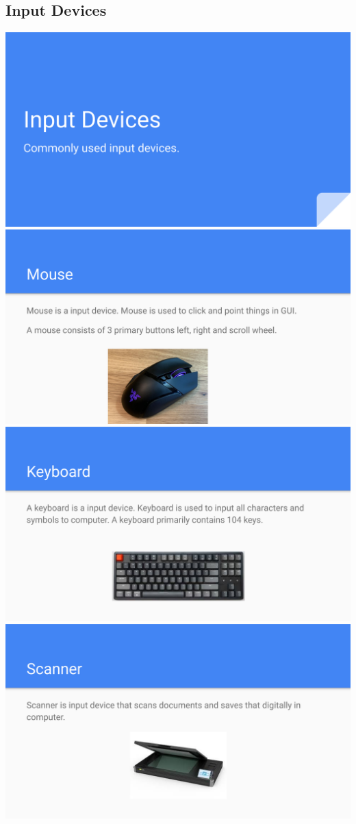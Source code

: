 \documentclass[17pt,a4paper,oneside,margin=1in]{article}
\begin{document}
\subsection{Input Devices}
\begin{center}
	\includegraphics[width=0.7\linewidth]{./scrot/input-0.png}
	\includegraphics[width=0.7\linewidth]{./scrot/input-1.png}
	\includegraphics[width=0.7\linewidth]{./scrot/input-2.png}
	\includegraphics[width=0.7\linewidth]{./scrot/input-3.png}
\end{center}
\end{document}
